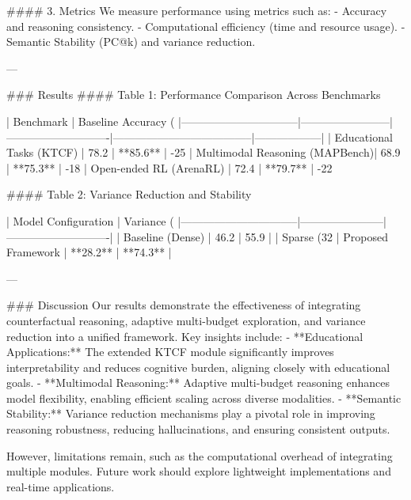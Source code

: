 #### 3. Metrics
We measure performance using metrics such as:
   - Accuracy and reasoning consistency.
   - Computational efficiency (time and resource usage).
   - Semantic Stability (PC@k) and variance reduction.

---

### Results
#### Table 1: Performance Comparison Across Benchmarks

| Benchmark                      | Baseline Accuracy (%
|--------------------------------|------------------------|----------------------------|--------------------------------------|------------------|
| Educational Tasks (KTCF)       | 78.2                  | **85.6**                   | -25%
| Multimodal Reasoning (MAPBench)| 68.9                  | **75.3**                   | -18%
| Open-ended RL (ArenaRL)        | 72.4                  | **79.7**                   | -22%

#### Table 2: Variance Reduction and Stability

| Model Configuration            | Variance (%
|--------------------------------|-----------------------|----------------------------|
| Baseline (Dense)               | 46.2                 | 55.9                      |
| Sparse (32%
| Proposed Framework             | **28.2**             | **74.3**                  |

---

### Discussion
Our results demonstrate the effectiveness of integrating counterfactual reasoning, adaptive multi-budget exploration, and variance reduction into a unified framework. Key insights include:
   - **Educational Applications:** The extended KTCF module significantly improves interpretability and reduces cognitive burden, aligning closely with educational goals.
   - **Multimodal Reasoning:** Adaptive multi-budget reasoning enhances model flexibility, enabling efficient scaling across diverse modalities.
   - **Semantic Stability:** Variance reduction mechanisms play a pivotal role in improving reasoning robustness, reducing hallucinations, and ensuring consistent outputs.

However, limitations remain, such as the computational overhead of integrating multiple modules. Future work should explore lightweight implementations and real-time applications.

